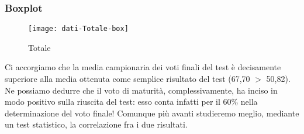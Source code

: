 \subsubsection{Boxplot}
\begin{figure}[!h]
  \centering
  \texttt{[image: dati-Totale-box]}
  \caption{Totale}
\end{figure}
Ci accorgiamo che la media campionaria dei voti finali del test è decisamente superiore alla media ottenuta come semplice risultato del test (67,70 $>$ 50,82). Ne possiamo dedurre che il voto di maturità, complessivamente, ha inciso in modo positivo sulla riuscita del test: esso conta infatti per il 60\%  nella determinazione del voto finale! Comunque più avanti studieremo meglio, mediante un test statistico, la correlazione fra i due risultati.
\restoregeometry
\clearpage


